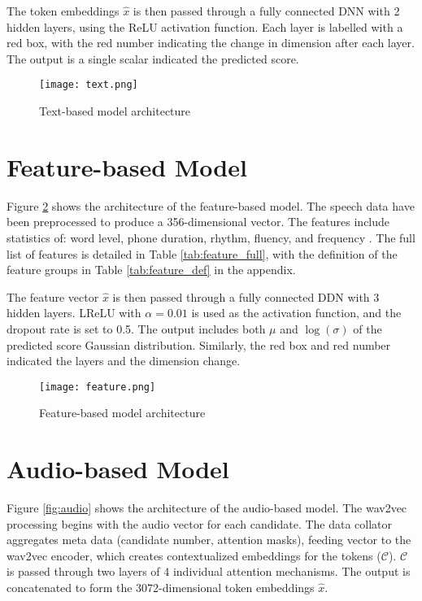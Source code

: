 The token embeddings $\hat{x}$ is then passed through a fully connected DNN with 2 hidden layers, using the ReLU activation function. Each layer is labelled with a red box, with the red number indicating the change in dimension after each layer. The output is a single scalar indicated the predicted score.

\begin{figure}[H]
    \centering
    \texttt{[image: text.png]}
    \caption{Text-based model architecture}
    \label{fig:text}
\end{figure}

\section{Feature-based Model}
Figure \ref{fig:feature} shows the architecture of the feature-based model. The speech data have been preprocessed to produce a 356-dimensional vector. The features include statistics of: word level, phone duration, rhythm, fluency, and frequency \cite{graders}. The full list of features is detailed in Table \ref{tab:feature_full}, with the definition of the feature groups in Table \ref{tab:feature_def} in the appendix.

The feature vector $\hat{x}$ is then passed through a fully connected DDN with 3 hidden layers. LReLU with $\alpha = 0.01$ is used as the activation function, and the dropout rate is set to 0.5. The output includes both $\mu$ and $\log(\sigma)$ of the predicted score Gaussian distribution. Similarly, the red box and red number indicated the layers and the dimension change.

\begin{figure}[H]
    \centering
    \texttt{[image: feature.png]}
    \caption{Feature-based model architecture}
    \label{fig:feature}
\end{figure}

\section{Audio-based Model}
Figure \ref{fig:audio} shows the architecture of the audio-based model. The wav2vec processing begins with the audio vector for each candidate. The data collator aggregates meta data (candidate number, attention masks), feeding vector to the wav2vec encoder, which creates contextualized embeddings for the tokens ($\mathcal{C}$). $\mathcal{C}$ is passed through two layers of 4 individual attention mechanisms. The output is concatenated to form the 3072-dimensional  token embeddings $\hat{x}$.

